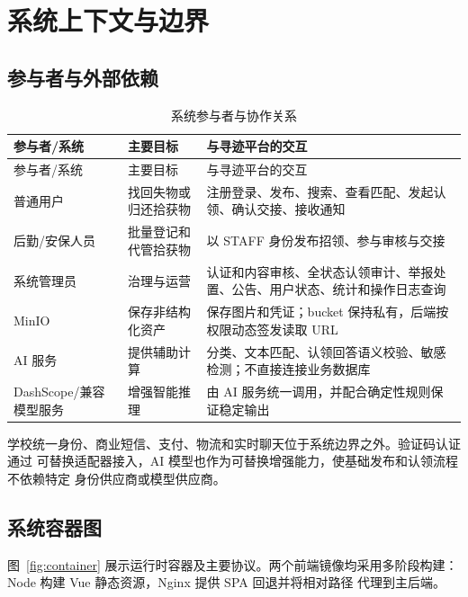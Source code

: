 \section{系统上下文与边界}

\subsection{参与者与外部依赖}

\begin{longtable}{L{2.8cm} L{4.4cm} L{7.0cm}}
  \caption{系统参与者与协作关系}\label{tab:context-actors}\\
  \toprule
  参与者/系统 & 主要目标 & 与寻迹平台的交互 \\
  \midrule
  \endfirsthead
  \toprule
  参与者/系统 & 主要目标 & 与寻迹平台的交互 \\
  \midrule
  \endhead
  普通用户 & 找回失物或归还拾获物 & 注册登录、发布、搜索、查看匹配、发起认领、确认交接、接收通知 \\
  后勤/安保人员 & 批量登记和代管拾获物 & 以 STAFF 身份发布招领、参与审核与交接 \\
  系统管理员 & 治理与运营 & 认证和内容审核、全状态认领审计、举报处置、公告、用户状态、统计和操作日志查询 \\
  MinIO & 保存非结构化资产 & 保存图片和凭证；bucket 保持私有，后端按权限动态签发读取 URL \\
  AI 服务 & 提供辅助计算 & 分类、文本匹配、认领回答语义校验、敏感检测；不直接连接业务数据库 \\
  DashScope/兼容模型服务 & 增强智能推理 & 由 AI 服务统一调用，并配合确定性规则保证稳定输出 \\
  \bottomrule
\end{longtable}

学校统一身份、商业短信、支付、物流和实时聊天位于系统边界之外。验证码认证通过
可替换适配器接入，AI 模型也作为可替换增强能力，使基础发布和认领流程不依赖特定
身份供应商或模型供应商。

\subsection{系统容器图}

图~\ref{fig:container} 展示运行时容器及主要协议。两个前端镜像均采用多阶段构建：Node
构建 Vue 静态资源，Nginx 提供 SPA 回退并将相对路径  代理到主后端。

